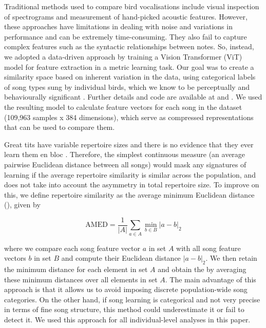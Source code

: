\documentclass[9pt, twocolumn, twoside]{gsajnl}
\begin{document}
Traditional methods used to compare bird vocalisations include visual inspection of spectrograms and measurement of hand-picked acoustic features. However, these approaches have limitations in dealing with noise and variations in performance and can be extremely time-consuming. They also fail to capture complex features such as the syntactic relationships between notes. So, instead, we adopted a data-driven approach by training a Vision Transformer (ViT) model for feature extraction in a metric learning task. Our goal was to create a similarity space based on inherent variation in the data, using categorical labels of song types sung by individual birds, which we know to be perceptually and behaviourally significant \parencite{lind1996}. Further details and code are available at \parencite{merinorecalde2023} and \parencite{merinorecalde2023a}. We used the resulting model to calculate feature vectors for each song in the dataset (109,963 samples x 384 dimensions), which serve as compressed representations that can be used to compare them.

Great tits have variable repertoire sizes and there is no evidence that they ever learn them en bloc \parencite{mcgregor1982b, rivera-gutierrez2010a}. Therefore, the simplest continuous measure (an average pairwise Euclidean distance between all songs) would mask any signatures of learning if the average repertoire similarity is similar across the population, and does not take into account the asymmetry in total repertoire size. To improve on this, we define repertoire similarity as the average minimum Euclidean distance (), given by

\begin{equation} 
\label{eq1}
\text{AMED} = \frac{1}{|A|} \sum_{a \in A} \min_{b \in B} \left| a - b \right|_2
\end{equation}


where we compare each song feature vector $a$ in set $A$ with all song feature vectors $b$ in set $B$ and compute their Euclidean distance $\left| a - b \right|_2$. We then retain the minimum distance for each element in set $A$ and obtain the  by averaging these minimum distances over all elements in set $A$.
The main advantage of this approach is that it allows us to avoid imposing discrete population-wide song categories. On the other hand, if song learning is categorical and not very precise in terms of fine song structure, this method could underestimate it or fail to detect it. We used this approach for all individual-level analyses in this paper. 
\end{document}
